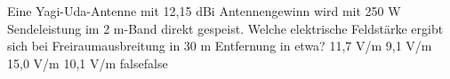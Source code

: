     {Eine Yagi-Uda-Antenne mit 12,15 dBi Antennengewinn wird mit 250 W Sendeleistung im 2 m-Band direkt gespeist. Welche elektrische Feldstärke ergibt sich bei Freiraumausbreitung in 30 m Entfernung in etwa?}
    {11,7 V/m}
    {9,1 V/m}
    {15,0 V/m}
    {10,1 V/m}
    {false}{false}